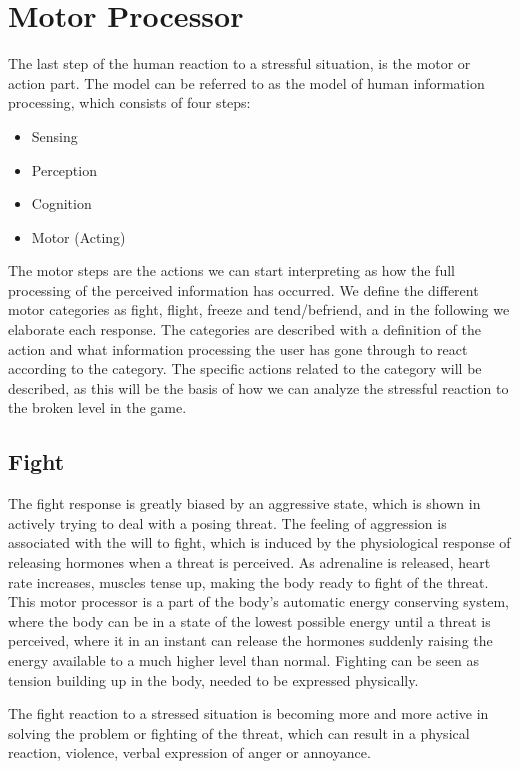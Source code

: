 \section{Motor Processor}
The last step of the human reaction to a stressful situation, is the motor or action part. The model can be referred to as the model of human information processing, which consists of four steps:
\begin{itemize}
\item Sensing
\item Perception
\item Cognition
\item Motor (Acting)
\end{itemize}
The motor steps are the actions we can start interpreting as how the full processing of the perceived information has occurred.\cite{humanprocessor} We define the different motor categories as fight, flight, freeze and tend/befriend, and in the following we elaborate each response. The categories are described with a definition of the action and what information processing the user has gone through to react according to the category. The specific actions related to the category will be described, as this will be the basis of how we can analyze the stressful reaction to the broken level in the game. 

\subsection{Fight}
The fight response is greatly biased by an aggressive state, which is shown in actively trying to deal with a posing threat. The feeling of aggression is associated with the will to fight, which is induced by the physiological response of releasing hormones when a threat is perceived. As adrenaline is released, heart rate increases, muscles tense up, making the body ready to fight of the threat. This motor processor is a part of the body's automatic energy conserving system, where the body can be in a state of the lowest possible energy until a threat is perceived, where it in an instant can release the hormones suddenly raising the energy available to a much higher level than normal. Fighting can be seen as tension building up in the body, needed to be expressed physically.

The fight reaction to a stressed situation is becoming more and more active in solving the problem or fighting of the threat, which can result in a physical reaction, violence, verbal expression of anger or annoyance.


